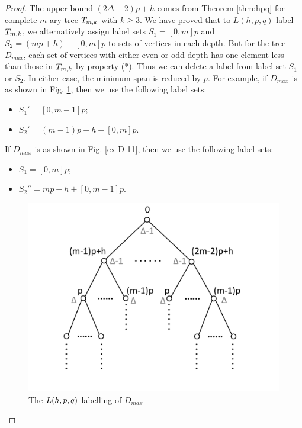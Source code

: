 \begin{proof}
The upper bound $(2\Delta-2)p+h$ comes from Theorem \ref{thm:hpq} for complete $m$-ary tree $T_{m,k}$ with $k \ge 3$. We have proved that to $L(h,p,q)$-label $T_{m,k}$, we alternatively assign label sets $S_1=[0,m]p$ and $S_2=(mp+h)+[0,m]p$ to sets of vertices in each depth. But for the tree $D_{max}$, each set of vertices with either even or odd depth has one element less than those in $T_{m,k}$ by property (*). Thus we can delete a label from label set $S_1$ or $S_2$. In either case, the minimum span is reduced by $p$. For example, if $D_{max}$ is as shown in Fig. \ref{ex D 1}, then we use the following label sets: 
\begin{itemize}
\item $S_1' = [0, m-1]p$; 
\item $S_2' = (m-1)p+h+[0,m]p$. 
\end{itemize}
If $D_{max}$ is as shown in Fig. \ref{ex D 11}, then we use the following label sets: 
\begin{itemize}
\item $S_1=[0,m]p$;
\item $S_2''=mp+h+[0,m-1]p$. 
\end{itemize}

\begin{figure}
 \centering
      \vspace{-5pt}
    \includegraphics[scale=0.4]{../figures/fig3-6-a.pdf}
        \vspace{-0pt}
\caption{The $L(h,p,q)$-labelling of $D_{max}$}
\label{ex D 1}
\end{figure}


\end{proof}
